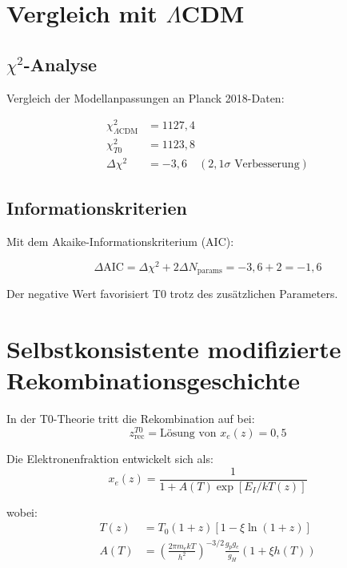 \documentclass[12pt,a4paper]{article}
\begin{document}
	\section{Vergleich mit $\Lambda$CDM}
	\label{sec:comparison}
	
	\subsection{$\chi^2$-Analyse}
	
	Vergleich der Modellanpassungen an Planck 2018-Daten:
	
	\begin{align}
		\chi^2_{\Lambda\text{CDM}} &= 1127,4 \\
		\chi^2_{T0} &= 1123,8 \\
		\Delta\chi^2 &= -3,6 \quad (2,1\sigma \text{ Verbesserung})
	\end{align}
	
	\subsection{Informationskriterien}
	
	Mit dem Akaike-Informationskriterium (AIC):
	
	\begin{equation}
		\Delta\text{AIC} = \Delta\chi^2 + 2\Delta N_{\text{params}} = -3,6 + 2 = -1,6
	\end{equation}
	
	Der negative Wert favorisiert T0 trotz des zusätzlichen Parameters.
	
	\section{Selbstkonsistente modifizierte Rekombinationsgeschichte}
	
	In der T0-Theorie tritt die Rekombination auf bei:
	\begin{equation}
		z_{\text{rec}}^{T0} = \text{Lösung von } x_e(z) = 0,5
	\end{equation}
	
	Die Elektronenfraktion entwickelt sich als:
	\begin{equation}
		x_e(z) = \frac{1}{1 + A(T) \exp[E_I/kT(z)]}
	\end{equation}
	
	wobei:
	\begin{align}
		T(z) &= T_0(1+z)[1 - \xi\ln(1+z)] \\
		A(T) &= \left(\frac{2\pi m_e kT}{h^2}\right)^{-3/2} 
		\frac{g_p g_e}{g_H} (1 + \xi h(T))
	\end{align}
	
\end{document}

